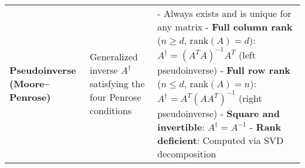 \documentclass[12pt]{article}
\begin{document}
\begin{longtable}{|>{\bfseries}m{3.5cm}|m{5cm}|m{10.5cm}|}
		\hline
		Pseudoinverse (Moore--Penrose) & Generalized inverse $A^\dagger$
		satisfying the four Penrose conditions &
		- Always exists and is unique for any matrix \newline
		- \textbf{Full column rank} ($n \geq d$, $\text{rank}(A) = d$): \newline
		\quad $A^\dagger = (A^T A)^{-1} A^T$ (left pseudoinverse) \newline
		- \textbf{Full row rank} ($n \leq d$, $\text{rank}(A) = n$): \newline
		\quad $A^\dagger = A^T (A A^T)^{-1}$ (right pseudoinverse) \newline
		- \textbf{Square and invertible}: $A^\dagger = A^{-1}$ \newline
		- \textbf{Rank deficient}: Computed via SVD decomposition \\


\end{longtable}
\end{document}
